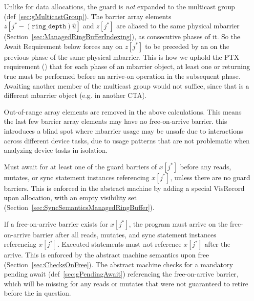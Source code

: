Unlike for data allocations, the guard is \emph{not} expanded to the multicast group (def~\ref{sec:gMulticastGroup}).
The barrier array elements $z[j^* - (\texttt{ring\_depth}) \widehat{u}]$ and $z[j^*]$ are aliased to the same physical mbarrier (Section~\ref{sec:ManagedRingBufferIndexing}), as consecutive phases of it.
So the Await Requirement below forces any  on $z[j^*]$ to be preceded by an  on the previous phase of the same physical mbarrier.
This is how we uphold the PTX requirement () that for each phase of an mbarrier object, at least one  or  returning true must be performed before an arrive-on operation in the subsequent phase.
Awaiting another member of the multicast group would not suffice, since that is a different mbarrier object (e.g. in another CTA).

Out-of-range array elements are removed in the above calculations.
This means the last few barrier array elements may have no free-on-arrive barrier.
 this introduces a blind spot where mbarrier usage may be unsafe due to interactions across different device tasks, due to usage patterns that are not problematic when analyzing device tasks in isolation.

 Must await for at least one of the guard barriers of $x[j^*]$ before any reads, mutates, or sync statement instances referencing $x[j^*]$, unless there are no guard barriers.
This is enforced in the abstract machine by adding a special \textsf{VisRecord} upon allocation, with an empty visibility set (Section~\ref{sec:SyncSemanticsManagedRingBuffer}).

 If a free-on-arrive barrier exists for $x[j^*]$, the program must arrive on the free-on-arrive barrier after all reads, mutates, and sync statement instances referencing $x[j^*]$.
Executed statements must not reference $x[j^*]$ after the arrive.
This is enforced by the abstract machine semantics upon free (Section~\ref{sec:ChecksOnFree}).
The abstract machine checks for a mandatory pending await (def~\ref{sec:gPendingAwait}) referencing the free-on-arrive barrier, which will be missing for any reads or mutates that were not guaranteed to retire before the  in question.
